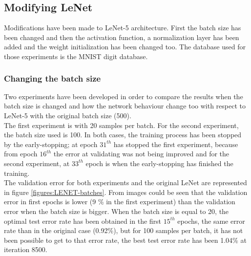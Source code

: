 \subsection{Modifying LeNet}
Modifications have been made to LeNet-5 architecture. First the batch size has been changed and then the activation function, a normalization layer has been added and the weight initialization has been changed too. The database used for those experiments is the MNIST digit database.\\

\subsubsection{Changing the batch size}
Two experiments have been developed in order to compare the results when the batch size is changed and how the network behaviour change too with respect to LeNet-5 with the original batch size (500).\\

The first experiment is with 20 samples per batch. For the second experiment, the batch size used is 100. In both cases, the training process has been stopped by the early-stopping; at epoch $31^{th}$ has stopped the first experiment, because from epoch $16^{th}$ the error at validating was not being improved and for the second experiment, at $33^{th}$ epoch is when the early-stopping has finished the training.\\

The validation error for both experiments and the original LeNet are represented in figure \ref{figures:LENET-batches}. From images could be seen that the validation error in first epochs is lower (9 \% in the first experiment) than the validation error when the batch size is bigger. When the batch size is equal to 20, the optimal test error rate has been obtained in the first $15^{th}$ epochs, the same error rate than in the original case (0.92\%), but for 100 samples per batch, it has not been possible to get to that error rate, the best test error rate has been 1.04\% at iteration 8500.\\

